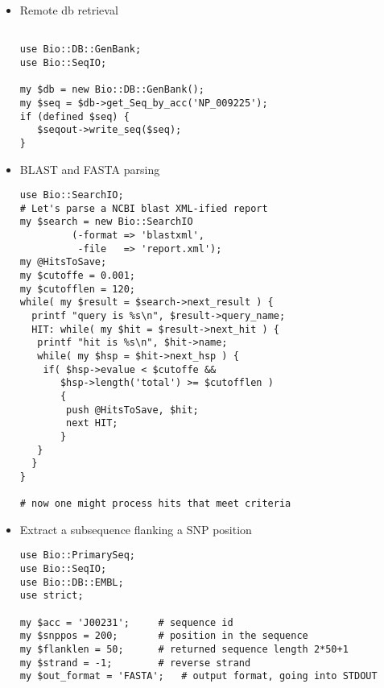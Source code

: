 \documentclass{article}
\begin{document}
\begin{twocolumn}
\begin{itemize}
\begin{scriptsize}
\begin{verbatim}
foreach ( qw(NP_009225 YPKA_YERPS)) {
    my $seq = $index->fetch($_);
    # skip if seq not found
    next unless defined $seq; 
    # write it out to STDOUT
    $seqout->write_seq($seq); 
}

sub ncbi_idparse { 
 my ($id) = @_;
 my @ids = split(/\|/,$id);
 my $acc = ($ids[3] =~ /(\S+)\.\d+/);	
 return ( $ids[1],$acc,$ids[3]);	
}
\end{verbatim}
\end{scriptsize}

\item Remote db retrieval
\begin{scriptsize}
\begin{verbatim}

use Bio::DB::GenBank;
use Bio::SeqIO;

my $db = new Bio::DB::GenBank();
my $seq = $db->get_Seq_by_acc('NP_009225');
if (defined $seq) {
   $seqout->write_seq($seq);
}
\end{verbatim}
\end{scriptsize}

\item BLAST and FASTA parsing
\begin{scriptsize}
\begin{verbatim}
use Bio::SearchIO;
# Let's parse a NCBI blast XML-ified report  
my $search = new Bio::SearchIO
         (-format => 'blastxml',
          -file   => 'report.xml');
my @HitsToSave;
my $cutoffe = 0.001;
my $cutofflen = 120;
while( my $result = $search->next_result ) {
  printf "query is %s\n", $result->query_name;
  HIT: while( my $hit = $result->next_hit ) {
   printf "hit is %s\n", $hit->name;
   while( my $hsp = $hit->next_hsp ) {
    if( $hsp->evalue < $cutoffe &&
       $hsp->length('total') >= $cutofflen ) 
       {
	    push @HitsToSave, $hit;
	    next HIT;
       } 
   }
  }
}

# now one might process hits that meet criteria

\end{verbatim}
\end{scriptsize}

\item Extract a subsequence flanking a SNP position
\begin{scriptsize}
\begin{verbatim}
use Bio::PrimarySeq;
use Bio::SeqIO;
use Bio::DB::EMBL;
use strict;

my $acc = 'J00231';		# sequence id
my $snppos = 200;		# position in the sequence
my $flanklen = 50;		# returned sequence length 2*50+1
my $strand = -1;		# reverse strand
my $out_format = 'FASTA';	# output format, going into STDOUT


\end{verbatim}
\end{scriptsize}
\end{itemize}
\end{twocolumn}
\end{document}

